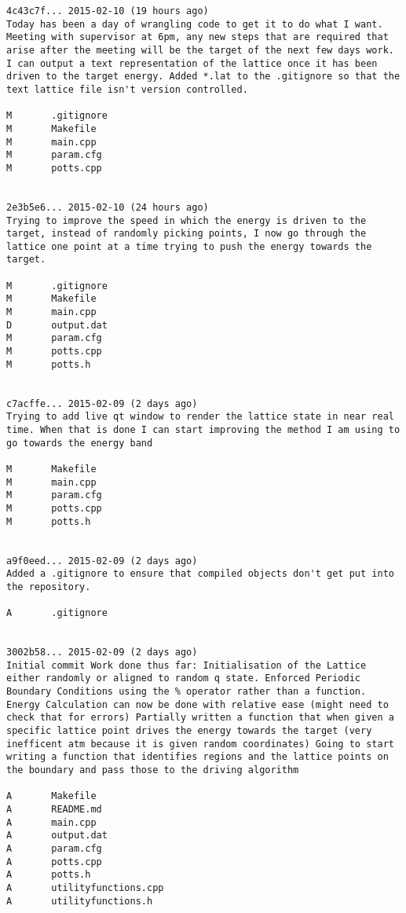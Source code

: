 \documentclass[12pt,a4paper,notitlepage,twoside]{memoir}
\begin{document}
\begin{lstlisting}[breaklines]
4c43c7f... 2015-02-10 (19 hours ago)
Today has been a day of wrangling code to get it to do what I want. Meeting with supervisor at 6pm, any new steps that are required that arise after the meeting will be the target of the next few days work. I can output a text representation of the lattice once it has been driven to the target energy. Added *.lat to the .gitignore so that the text lattice file isn't version controlled.

M       .gitignore
M       Makefile
M       main.cpp
M       param.cfg
M       potts.cpp


2e3b5e6... 2015-02-10 (24 hours ago)
Trying to improve the speed in which the energy is driven to the target, instead of randomly picking points, I now go through the lattice one point at a time trying to push the energy towards the target.

M       .gitignore
M       Makefile
M       main.cpp
D       output.dat
M       param.cfg
M       potts.cpp
M       potts.h


c7acffe... 2015-02-09 (2 days ago)
Trying to add live qt window to render the lattice state in near real time. When that is done I can start improving the method I am using to go towards the energy band

M       Makefile
M       main.cpp
M       param.cfg
M       potts.cpp
M       potts.h


a9f0eed... 2015-02-09 (2 days ago)
Added a .gitignore to ensure that compiled objects don't get put into the repository.

A       .gitignore


3002b58... 2015-02-09 (2 days ago)
Initial commit Work done thus far: Initialisation of the Lattice either randomly or aligned to random q state. Enforced Periodic Boundary Conditions using the % operator rather than a function. Energy Calculation can now be done with relative ease (might need to check that for errors) Partially written a function that when given a specific lattice point drives the energy towards the target (very inefficent atm because it is given random coordinates) Going to start writing a function that identifies regions and the lattice points on the boundary and pass those to the driving algorithm

A       Makefile
A       README.md
A       main.cpp
A       output.dat
A       param.cfg
A       potts.cpp
A       potts.h
A       utilityfunctions.cpp
A       utilityfunctions.h

\end{lstlisting}
\end{document}
